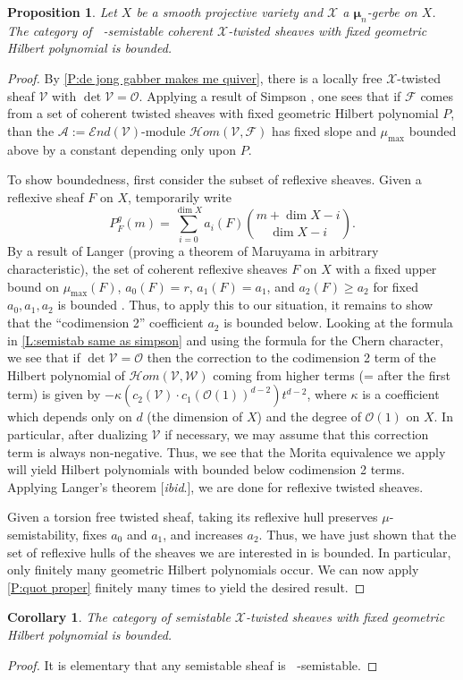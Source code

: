 \documentclass[11pt]{amsart}
\newcommand{\ms}[1]{\mathscr #1}
\newcommand{\shom}{\ms H\!om}
\newcommand{\send}{\ms E\!nd}
\DeclareMathOperator{\muhat}{\widehat{\mu}}
\newcommand{\m}{\boldsymbol{\mu}}
\renewcommand{\[}{[\!\hspace{0.03em}[}
\renewcommand{\]}{]\!\hspace{0.03em}]}
\renewcommand{\(}{(\!\hspace{0.03em}(}
\renewcommand{\)}{)\!\hspace{0.03em})}
\newtheorem{prop}[lem]{Proposition}
\newtheorem{cor}[lem]{Corollary}
\theoremstyle{definition}
\theoremstyle{remark}
\begin{document}
\begin{prop} Let $X$ be a smooth projective variety and $\ms X$ a 
$\m_{n}$-gerbe on $X$.  The category of $\muhat$-semistable 
coherent $\ms X$-twisted sheaves with fixed geometric Hilbert 
polynomial is bounded.
\end{prop}
\begin{proof} By \ref{P:de jong gabber makes me quiver}, there is a locally free 
$\ms X$-twisted sheaf $\ms V$ with $\det\ms V={\ms O}$.  
Applying a result of Simpson \cite[3.3]{simpson}, one sees that if $\ms F$ comes from a set of coherent twisted sheaves with fixed geometric Hilbert polynomial $P$, than the $\ms A:=\send(\ms V)$-module $\shom(\ms V,\ms F)$ has fixed slope and $\mu_{\text{max}}$ bounded above by a constant depending only upon $P$.

To show boundedness, first consider the subset of reflexive sheaves.  
Given a reflexive sheaf $F$ on $X$, temporarily write 
$$P^{g}_{F}(m)=\sum_{i=0}^{\dim X}a_{i}(F)\binom{m+\dim X-i}{\dim 
X-i}.$$
By a result of Langer (proving a theorem of Maruyama in arbitrary 
characteristic), the set of coherent reflexive 
sheaves $F$ on $X$ with a fixed upper bound on $\mu_{\text{max}}(F)$, 
$a_{0}(F)=r$, $a_{1}(F)=a_{1}$, and $a_{2}(F)\geq a_{2}$ for fixed 
$a_{0},a_{1},a_{2}$ is bounded \cite[4.3]{langer}.  Thus, to apply this to 
our situation,
it remains to show that the ``codimension 2'' coefficient $a_{2}$ is 
bounded below.  Looking at the formula in 
\ref{L:semistab same as simpson} and using the formula for the Chern 
character, we see that if $\det\ms V={\ms O}$ then 
the correction to the codimension 2 term of the Hilbert polynomial of $\shom(\ms V,\ms 
W)$ coming from higher terms (= after the first term) is given by 
$-\kappa(c_{2}(\ms V)\cdot c_{1}({\ms O}(1))^{d-2})t^{d-2}$, where $\kappa$ is 
a coefficient which depends only on $d$ (the dimension of $X$) and 
the degree of ${\ms O}(1)$ on $X$.  In particular, after dualizing $\ms V$ 
if necessary, we may assume that this correction term is always 
non-negative.  Thus, we see that the Morita equivalence we apply will 
yield Hilbert polynomials with bounded below codimension 2 terms.  
Applying Langer's theorem [\textit{ibid\/}.], we are done for reflexive twisted 
sheaves.

Given a torsion free twisted sheaf, taking its reflexive hull 
preserves $\mu$-semistability, fixes 
$a_{0}$ and $a_{1}$, and increases $a_{2}$.  Thus, we have just shown 
that the set of reflexive hulls of the sheaves we are interested in 
is bounded.  In particular, only finitely many geometric Hilbert 
polynomials occur.  We can now apply \ref{P:quot proper} finitely many 
times to yield the desired result.
\end{proof}
\begin{cor}\label{C:boundedness} The category of semistable $\ms X$-twisted 
sheaves with fixed geometric Hilbert polynomial is bounded.
\end{cor}
\begin{proof} It is elementary that any semistable sheaf is 
$\muhat$-semistable.
\end{proof}
\end{document}
